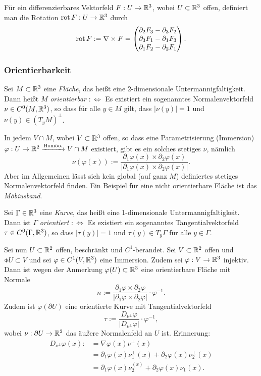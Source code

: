 Für ein differenzierbares Vektorfeld $F: U \to \mathbb{R}^3$, wobei $U \subset \mathbb{R}^3$ offen, definiert man die Rotation $\operatorname{rot} F: U \to \mathbb{R}^3$ durch
\[ \operatorname{rot} F := \nabla \times F = \begin{pmatrix} \partial_2 F_3 - \partial_3 F_2 \\ \partial_3 F_1 - \partial_1 F_3 \\ \partial_1 F_2 - \partial_2 F_1 \end{pmatrix}. \]

\subsubsection{Orientierbarkeit}
Sei $M \subset \mathbb{R}^3$ eine \emph{Fläche}, das heißt eine 2-dimensionale Untermannigfaltigkeit. Dann heißt $M$ \emph{orientierbar} $:\Leftrightarrow$ Es existiert ein sogenanntes Normalenvektorfeld $\nu \in C^0(M,\mathbb{R}^3)$, so dass für alle $y \in M$ gilt, dass $|\nu(y)| = 1$ und $\nu(y) \in (T_y M)^\perp$.

\begin{rmrk}
 In jedem $V \cap M$, wobei $V \subset \mathbb{R}^3$ offen, so dass eine Parametrisierung (Immersion) $\varphi: U \to \mathbb{R}^2 \xrightarrow{\text{Homöo.}} V \cap M$ existiert, gibt es ein solches stetiges $\nu$, nämlich
 \[ \nu(\varphi(x)) := \frac{\partial_1 \varphi(x) \times \partial_2 \varphi(x)}{|\partial_1 \varphi(x) \times \partial_2 \varphi(x) |}. \]
 Aber im Allgemeinen lässt sich kein global (auf ganz $M$) definiertes stetiges Normalenvektorfeld finden. Ein Beispiel für eine nicht orientierbare Fläche ist das \emph{Möbiusband}.
\end{rmrk}

Sei $\Gamma \in \mathbb{R}^3$ eine \emph{Kurve}, das heißt eine 1-dimensionale Untermannigfaltigkeit. Dann ist $\Gamma$ \emph{orientiert} $:\Leftrightarrow$ Es existiert ein sogenanntes Tangentialvektorfeld $\tau \in C^0(\Gamma, \mathbb{R}^3)$, so dass $|\tau(y)| = 1$ und $\tau(y) \in T_y \Gamma$ für alle $y \in \Gamma$.

Sei nun $U \subset \mathbb{R}^2$ offen, beschränkt und $C^1$-berandet. Sei $V \subset \mathbb{R}^2$ offen und $\obar{U} \subset V$ und sei $\varphi \in C^1(V, \mathbb{R}^3)$ eine Immersion. Zudem sei $\varphi: V \to \mathbb{R}^3$ injektiv. Dann ist wegen der Anmerkung $\varphi(U) \subset \mathbb{R}^3$ eine orientierbare Fläche mit Normale
\[ n := \frac{\partial_1 \varphi \times \partial_2 \varphi}{|\partial_1 \varphi \times \partial_2 \varphi|} \cdot \varphi^{-1}. \tag{1} \]
Zudem ist $\varphi(\partial U)$ eine orientierte Kurve mit Tangentialvektorfeld
\[ \tau := \frac{D_{\nu^\perp} \varphi}{| D_{\nu^\perp} \varphi |} \cdot \varphi^{-1}, \tag{2} \]
wobei $\nu: \partial U \to \mathbb{R}^2$ das äußere Normalenfeld an $U$ ist. Erinnerung:
\[ \begin{aligned}
    D_{\nu^\perp} \varphi(x) :&= \nabla \varphi(x) \nu^\perp (x) \\
    &= \partial_1 \varphi(x) \nu_1^\perp(x) + \partial_2 \varphi(x) \nu_2^\perp(x) \\
    &= \partial_1 \varphi(x) \nu_2^(x) + \partial_2 \varphi(x) \nu_1(x).
   \end{aligned} \]

